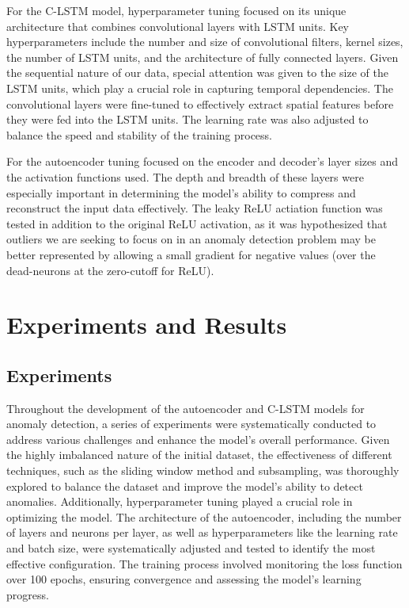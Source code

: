 \documentclass[10pt,twocolumn,letterpaper]{article}
\begin{document}
For the C-LSTM model, hyperparameter tuning focused on its unique architecture that combines convolutional layers with LSTM units. 
Key hyperparameters include the number and size of convolutional filters, kernel sizes, the number of LSTM units, and the architecture of fully connected layers. 
Given the sequential nature of our data, special attention was given to the size of the LSTM units, which play a crucial role in capturing temporal dependencies.
The convolutional layers were fine-tuned to effectively extract spatial features before they were fed into the LSTM units. The learning rate was also 
adjusted to balance the speed and stability of the training process.

For the autoencoder tuning focused on the encoder and decoder's layer sizes and the activation functions used. The depth and breadth of these layers were 
especially important in determining the model's ability to compress and reconstruct the input data effectively. The leaky ReLU actiation function was tested
in addition to the original ReLU activation, as it was hypothesized that outliers we are seeking to focus on in an anomaly detection problem may be better 
represented by allowing a small gradient for negative values (over the dead-neurons at the zero-cutoff for ReLU).


\section{Experiments and Results}

\subsection{Experiments}
Throughout the development of the autoencoder and C-LSTM models for anomaly detection, a series of experiments were systematically conducted to address various challenges and 
enhance the model's overall performance. Given the highly imbalanced nature of the initial dataset, the effectiveness of different techniques, such as the sliding window 
method and subsampling, was thoroughly explored to balance the dataset and improve the model's ability to detect anomalies. Additionally, hyperparameter tuning played a 
crucial role in optimizing the model. The architecture of the autoencoder, including the number of layers and neurons per layer, as well as hyperparameters like the learning 
rate and batch size, were systematically adjusted and tested to identify the most effective configuration. The training process involved monitoring the loss function over 100 
epochs, ensuring convergence and assessing the model's learning progress.
\end{document}
